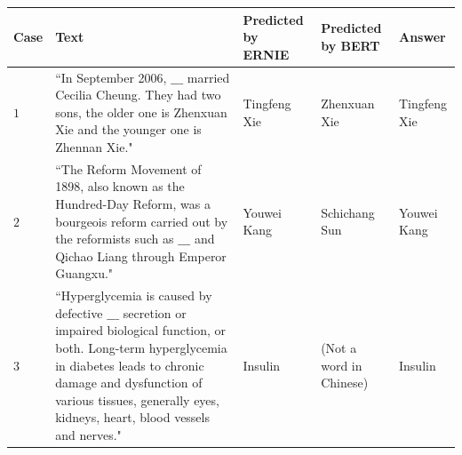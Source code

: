 \begin{table}[htbp]
    \small 
    \centering
    \setlength{\tabcolsep}{6pt} %
    \renewcommand{\arraystretch}{2} %
    
    \begin{tableFont}
    \begin{tabu} to \textwidth {| X[0.5] | X[7] | X | X | X |}
        
        \hline
      
        \centering \textbf{Case}
        & \centering \textbf{Text} 
        & \centering \textbf{Predicted by ERNIE}\newline 
        & \centering\textbf{Predicted by BERT} 
        & \centering \textbf{Answer} \\ 
        
        \hline
        
        
        $1$
        &
        ``In September 2006, $\_\_\_$ married Cecilia Cheung. They had two sons, the older one is Zhenxuan Xie and the younger one is Zhennan Xie." \newline
        & 
        Tingfeng Xie
        & 
        Zhenxuan Xie
        & 
        {\color{Green} Tingfeng Xie} \\ 
        
        \hline 
        
        $2$
        &
        ``The Reform Movement of 1898, also known as the Hundred-Day Reform, was a bourgeois reform carried out by the reformists such as $\_\_\_$ and Qichao Liang through Emperor Guangxu."  \newline  
        & 
        Youwei Kang
        & 
        Schichang Sun
        & 
        {\color{Green} Youwei Kang} \\ 
        
        \hline 
        
        $3$
        &
        ``Hyperglycemia is caused by defective $\_\_\_$  secretion or impaired biological function, or both. Long-term hyperglycemia in diabetes leads to chronic damage and dysfunction of various tissues, generally eyes, kidneys, heart, blood vessels and nerves."   \newline 
        & 
        Insulin
        & 
        (Not a word in Chinese)
        & 
        {\color{Green} Insulin} \\ 
        
        \hline  
        

\end{tabu}
\end{tableFont}
\end{table}
